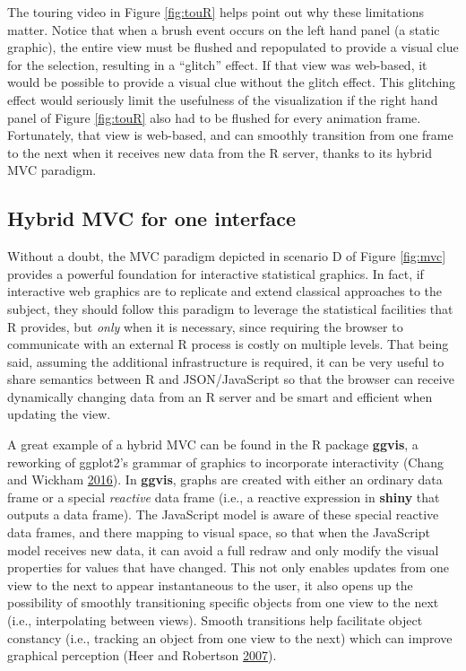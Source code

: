 \documentclass[12pt,]{isuthesis}
\begin{document}
The touring video in Figure \ref{fig:touR} helps point out why these
limitations matter. Notice that when a brush event occurs on the left
hand panel (a static graphic), the entire view must be flushed and
repopulated to provide a visual clue for the selection, resulting in a
``glitch'' effect. If that view was web-based, it would be possible to
provide a visual clue without the glitch effect. This glitching effect
would seriously limit the usefulness of the visualization if the right
hand panel of Figure \ref{fig:touR} also had to be flushed for every
animation frame. Fortunately, that view is web-based, and can smoothly
transition from one frame to the next when it receives new data from the
R server, thanks to its hybrid MVC paradigm.

\subsection{Hybrid MVC for one
interface}\label{hybrid-mvc-for-one-interface}

Without a doubt, the MVC paradigm depicted in scenario D of Figure
\ref{fig:mvc} provides a powerful foundation for interactive statistical
graphics. In fact, if interactive web graphics are to replicate and
extend classical approaches to the subject, they should follow this
paradigm to leverage the statistical facilities that R provides, but
\emph{only} when it is necessary, since requiring the browser to
communicate with an external R process is costly on multiple levels.
That being said, assuming the additional infrastructure is required, it
can be very useful to share semantics between R and JSON/JavaScript so
that the browser can receive dynamically changing data from an R server
and be smart and efficient when updating the view.

A great example of a hybrid MVC can be found in the R package
\textbf{ggvis}, a reworking of ggplot2's grammar of graphics to
incorporate interactivity (Chang and Wickham
\protect\hyperlink{ref-ggvis}{2016}). In \textbf{ggvis}, graphs are
created with either an ordinary data frame or a special \emph{reactive}
data frame (i.e., a reactive expression in \textbf{shiny} that outputs a
data frame). The JavaScript model is aware of these special reactive
data frames, and there mapping to visual space, so that when the
JavaScript model receives new data, it can avoid a full redraw and only
modify the visual properties for values that have changed. This not only
enables updates from one view to the next to appear instantaneous to the
user, it also opens up the possibility of smoothly transitioning
specific objects from one view to the next (i.e., interpolating between
views). Smooth transitions help facilitate object constancy (i.e.,
tracking an object from one view to the next) which can improve
graphical perception (Heer and Robertson
\protect\hyperlink{ref-animated-transitions}{2007}).
\end{document}
